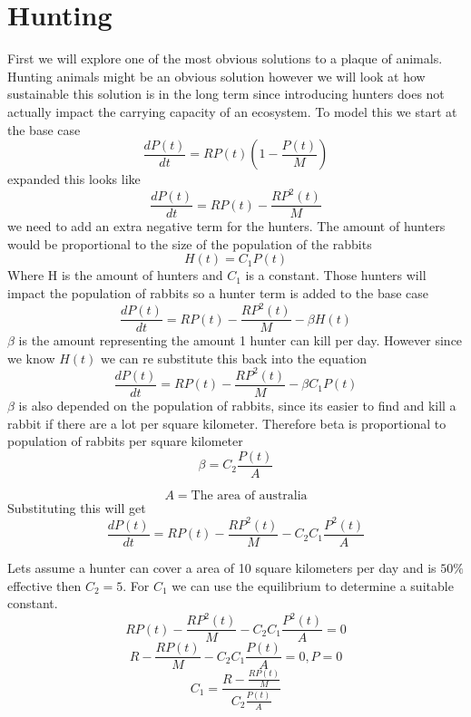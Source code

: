 \documentclass{article}
\begin{document}
\section{Hunting}
First we will explore one of the most obvious solutions to a plaque of animals. Hunting animals might be an obvious solution however we will look at how sustainable this solution is in the long term since introducing hunters does not actually impact the carrying capacity of an ecosystem. To model this we start at the base case 
$$
\frac{dP(t)}{dt} = RP(t)(1-\frac{P(t)}{M})
$$
expanded this looks like 
$$
\frac{dP(t)}{dt} = RP(t)-\frac{RP^2(t)}{M}
$$
we need to add an extra negative term for the hunters. The amount of hunters would be proportional to the size of the population of the rabbits
$$
H(t) = C_1 P(t)
$$
Where H is the amount of hunters and $C_1$ is a constant. Those hunters will impact the population of rabbits so a hunter term is added to the base case
$$
\frac{dP(t)}{dt} = RP(t)-\frac{RP^2(t)}{M} - \beta H(t)
$$
$\beta$ is the amount representing the amount 1 hunter can kill per day. However since we know $H(t)$ we can re substitute this back into the equation
$$
\frac{dP(t)}{dt} = RP(t)-\frac{RP^2(t)}{M} - \beta C_1 P(t)
$$
$\beta $ is also depended on the population of rabbits, since its easier to find and kill a rabbit if there are a lot per square kilometer. Therefore beta is proportional to population of rabbits per square kilometer
$$
\beta = C_2 \frac{P(t)}{A}
$$

$$A = \text{The area of australia}$$
Substituting this will get 
$$
\frac{dP(t)}{dt} = RP(t)-\frac{RP^2(t)}{M} - C_2 C_1 \frac{P^2(t)}{A}
$$

Lets assume a hunter can cover a area of 10 square kilometers per day and is $50\%$ effective then $C_2 = 5$. For  $C_1$ we can use the equilibrium to determine a suitable constant. 
$$RP(t)-\frac{RP^2(t)}{M} - C_2 C_1 \frac{P^2(t)}{A} = 0$$
$$ R-\frac{RP(t)}{M} - C_2 C_1 \frac{P(t)}{A} = 0, P = 0 $$
$$ C_1 = \frac{R-\frac{RP(t)}{M}}{C_2 \frac{P(t)}{A}} $$
\end{document}
